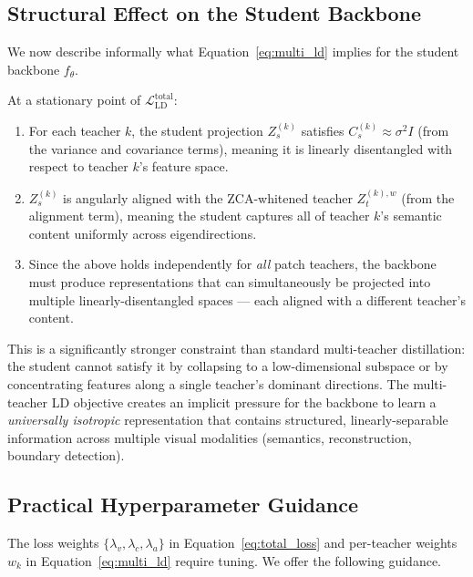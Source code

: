 \documentclass[11pt,a4paper]{article}
\newcommand{\calL}{\mathcal{L}}
\begin{document}
\subsection{Structural Effect on the Student Backbone}
\label{sec:backbone_effect}

We now describe informally what Equation~\eqref{eq:multi_ld} implies for the
student backbone $f_\theta$.

At a stationary point of $\calL_{\mathrm{LD}}^{\mathrm{total}}$:
\begin{enumerate}
    \item For each teacher $k$, the student projection $Z_s^{(k)}$ satisfies
          $C_s^{(k)} \approx \sigma^2 I$ (from the variance and covariance terms),
          meaning it is linearly disentangled with respect to teacher $k$'s
          feature space.
    \item $Z_s^{(k)}$ is angularly aligned with the ZCA-whitened teacher
          $Z_t^{(k),w}$ (from the alignment term), meaning the student captures
          all of teacher $k$'s semantic content uniformly across eigendirections.
    \item Since the above holds independently for \emph{all} patch teachers, the
          backbone must produce representations that can simultaneously be
          projected into multiple linearly-disentangled spaces — each aligned
          with a different teacher's content.
\end{enumerate}

This is a significantly stronger constraint than standard multi-teacher
distillation: the student cannot satisfy it by collapsing to a low-dimensional
subspace or by concentrating features along a single teacher's dominant
directions.  The multi-teacher LD objective creates an implicit pressure for the
backbone to learn a \emph{universally isotropic} representation that contains
structured, linearly-separable information across multiple visual modalities
(semantics, reconstruction, boundary detection).

\subsection{Practical Hyperparameter Guidance}
\label{sec:hyperparams}

The loss weights $\{\lambda_v, \lambda_c, \lambda_a\}$ in
Equation~\eqref{eq:total_loss} and per-teacher weights $w_k$ in
Equation~\eqref{eq:multi_ld} require tuning.  We offer the following guidance.
\end{document}
